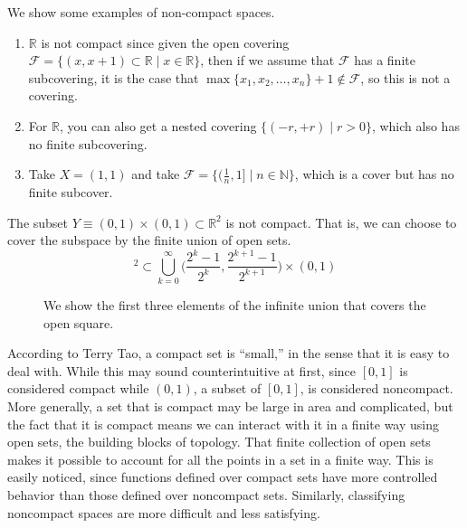   \begin{example}
    We show some examples of non-compact spaces. 
    \begin{enumerate}
      \item $\mathbb{R}$ is not compact since given the open covering $\mathcal{F} = \{ (x, x + 1) \subset \mathbb{R} \mid x \in \mathbb{R} \}$, then if we assume that $\mathcal{F}$ has a finite subcovering, it is the case that $\max\{x_1, x _2, \ldots, x_n \} + 1 \not\in \mathcal{F}$, so this is not a covering. 
      \item For $\mathbb{R}$, you can also get a nested covering $\{(-r, +r) \mid r > 0\}$, which also has no finite subcovering. 

      \item Take $X = (1, 1)$ and take $\mathcal{F} = \{ (\frac{1}{n}, 1] \mid n \in \mathbb{N} \}$, which is a cover but has no finite subcover. 
    \end{enumerate}
  \end{example}

  \begin{example}
    The subset $Y \equiv (0,1) \times (0,1) \subset \mathbb{R}^2$ is not compact. That is, we can choose to cover the subspace by the finite union of open sets. 
    \begin{equation}
      [0,1]^2 \subset \bigcup_{k=0}^\infty \Big( \frac{2^k - 1}{2^k}, \frac{2^{k+1} - 1}{2^{k+1}} \Big) \times (0,1)
    \end{equation}

    \begin{figure}[H]
      \centering 
      \caption{We show the first three elements of the infinite union that covers the open square. }
      \label{fig:closed_square_compact}
    \end{figure}
  \end{example}

  According to Terry Tao, a compact set is ``small,'' in the sense that it is easy to deal with. While this may sound counterintuitive at first, since $[0,1]$ is considered compact while $(0,1)$, a subset of $[0,1]$, is considered noncompact. More generally, a set that is compact may be large in area and complicated, but the fact that it is compact means we can interact with it in a finite way using open sets, the building blocks of topology. That finite collection of open sets makes it possible to account for all the points in a set in a finite way. This is easily noticed, since functions defined over compact sets have more controlled behavior than those defined over noncompact sets. Similarly, classifying noncompact spaces are more difficult and less satisfying. 

